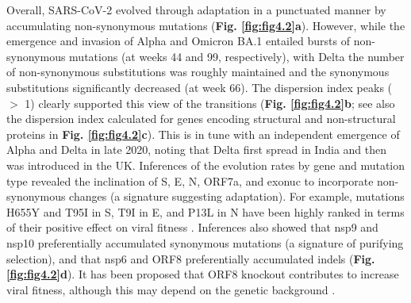 Overall, SARS-CoV-2 evolved through adaptation in a punctuated manner by accumulating non-synonymous mutations (\textbf{Fig. \ref{fig:fig4.2}a}). However, while the emergence and invasion of Alpha and Omicron BA.1 entailed bursts of non-synonymous mutations (at weeks 44 and 99, respectively), with Delta the number of non-synonymous substitutions was roughly maintained and the synonymous substitutions significantly decreased (at week 66). The dispersion index peaks ($>$ 1) clearly supported this view of the transitions (\textbf{Fig. \ref{fig:fig4.2}b}; see also the dispersion index calculated for genes encoding structural and non-structural proteins in \textbf{Fig. \ref{fig:fig4.2}c}). This is in tune with an independent emergence of Alpha and Delta in late 2020, noting that Delta first spread in India and then was introduced in the UK. Inferences of the evolution rates by gene and mutation type revealed the inclination of S, E, N, ORF7a, and exonuc to incorporate non-synonymous changes (a signature suggesting adaptation). For example, mutations H655Y and T95I in S, T9I in E, and P13L in N have been highly ranked in terms of their positive effect on viral fitness \cite{obermeyer2022analysis}. Inferences also showed that nsp9 and nsp10 preferentially accumulated synonymous mutations (a signature of purifying selection), and that nsp6 and ORF8 preferentially accumulated indels (\textbf{Fig. \ref{fig:fig4.2}d}). It has been proposed that ORF8 knockout contributes to increase viral fitness, although this may depend on the genetic background \cite{wagner2024positive}.

